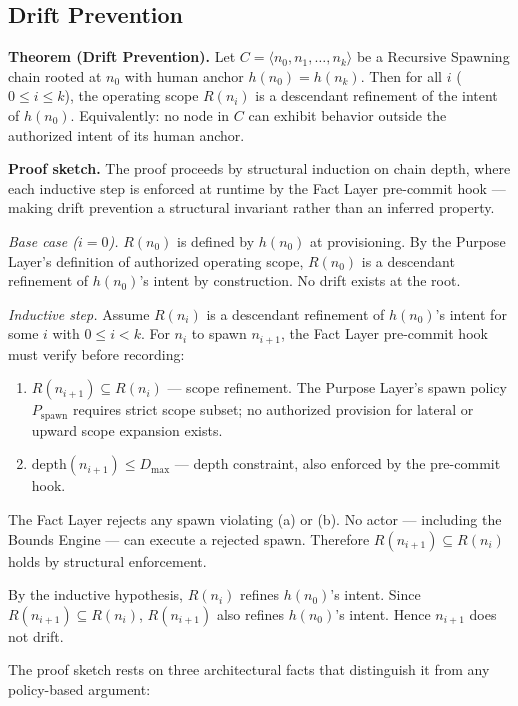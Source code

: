 \subsection{Drift Prevention}
\label{sec:rs-drift-prevention}

\medskip
\noindent\textbf{Theorem (Drift Prevention).} Let $C = \langle n_0, n_1, \ldots, n_k \rangle$ be a Recursive Spawning chain rooted at $n_0$ with human anchor $h(n_0) = h(n_k)$. Then for all $i$ ($0 \leq i \leq k$), the operating scope $R(n_i)$ is a descendant refinement of the intent of $h(n_0)$. Equivalently: no node in $C$ can exhibit behavior outside the authorized intent of its human anchor.

\medskip
\noindent\textbf{Proof sketch.} The proof proceeds by structural induction on chain depth, where each inductive step is enforced at runtime by the Fact Layer pre-commit hook — making drift prevention a structural invariant rather than an inferred property.

\medskip
\textit{Base case ($i=0$).} $R(n_0)$ is defined by $h(n_0)$ at provisioning. By the Purpose Layer's definition of authorized operating scope, $R(n_0)$ is a descendant refinement of $h(n_0)$'s intent by construction. No drift exists at the root.

\medskip
\textit{Inductive step.} Assume $R(n_i)$ is a descendant refinement of $h(n_0)$'s intent for some $i$ with $0 \leq i < k$. For $n_i$ to spawn $n_{i+1}$, the Fact Layer pre-commit hook must verify before recording:
\begin{enumerate}
    \item[(a)] $R(n_{i+1}) \subseteq R(n_i)$ — scope refinement. The Purpose Layer's spawn policy $P_{\mathrm{spawn}}$ requires strict scope subset; no authorized provision for lateral or upward scope expansion exists.
    \item[(b)] $\text{depth}(n_{i+1}) \leq D_{\max}$ — depth constraint, also enforced by the pre-commit hook.
\end{enumerate}
The Fact Layer rejects any spawn violating (a) or (b). No actor — including the Bounds Engine — can execute a rejected spawn. Therefore $R(n_{i+1}) \subseteq R(n_i)$ holds by structural enforcement.

By the inductive hypothesis, $R(n_i)$ refines $h(n_0)$'s intent. Since $R(n_{i+1}) \subseteq R(n_i)$, $R(n_{i+1})$ also refines $h(n_0)$'s intent. Hence $n_{i+1}$ does not drift.

\medskip
The proof sketch rests on three architectural facts that distinguish it from any policy-based argument:

